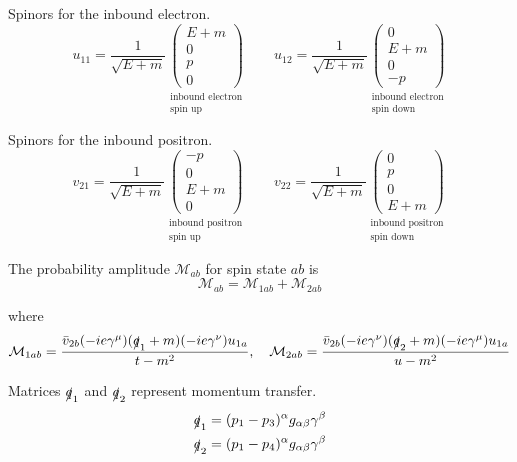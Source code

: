 Spinors for the inbound electron.
\begin{equation*}
u_{11}=\frac{1}{\sqrt{E+m}}
\underset{\substack{\text{inbound electron}\\ \text{spin up}}}
{\begin{pmatrix}E+m\\0\\p\\0\end{pmatrix}}
\qquad
u_{12}=\frac{1}{\sqrt{E+m}}
\underset{\substack{\text{inbound electron}\\ \text{spin down}}}
{\begin{pmatrix}0\\E+m\\0\\-p\end{pmatrix}}
\end{equation*}

Spinors for the inbound positron.
\begin{equation*}
v_{21}=\frac{1}{\sqrt{E+m}}
\underset{\substack{\text{inbound positron}\\ \text{spin up}}}
{\begin{pmatrix}-p\\0\\E+m\\0\end{pmatrix}}
\qquad
v_{22}=\frac{1}{\sqrt{E+m}}
\underset{\substack{\text{inbound positron}\\ \text{spin down}}}
{\begin{pmatrix}0\\p\\0\\E+m\end{pmatrix}}
\end{equation*}

The probability amplitude $\mathcal M_{ab}$ for spin state $ab$ is
\begin{equation*}
\mathcal M_{ab}=\mathcal M_{1ab}+\mathcal M_{2ab}
\end{equation*}

where
\begin{equation*}
\mathcal M_{1ab}=\frac{\bar v_{2b}(-ie\gamma^\mu)(\slashed q_1+m)(-ie\gamma^\nu)u_{1a}}{t-m^2},
\quad
\mathcal M_{2ab}=\frac{\bar v_{2b}(-ie\gamma^\nu)(\slashed q_2+m)(-ie\gamma^\mu)u_{1a}}{u-m^2}
\end{equation*}

Matrices $\slashed q_1$ and $\slashed q_2$ represent momentum transfer.
\begin{align*}
\slashed q_1&=(p_1-p_3)^\alpha g_{\alpha\beta}\gamma^\beta
\\
\slashed q_2&=(p_1-p_4)^\alpha g_{\alpha\beta}\gamma^\beta
\end{align*}


